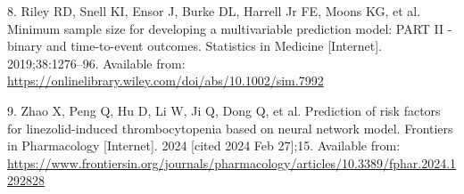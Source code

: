 \documentclass[
  letterpaper,
  DIV=11,
  numbers=noendperiod]{scrartcl}
\newlength{\cslhangindent}
\newenvironment{CSLReferences}[2] %
 {\begin{list}{}{%
  \setlength{\itemindent}{0pt}
  \setlength{\leftmargin}{0pt}
  \setlength{\parsep}{0pt}
  \ifodd #1
   \setlength{\leftmargin}{\cslhangindent}
   \setlength{\itemindent}{-1\cslhangindent}
  \fi
  \setlength{\itemsep}{#2\baselineskip}}}
 {\end{list}}
\begin{document}
\begin{CSLReferences}{0}{1}
8. Riley RD, Snell KI, Ensor J, Burke DL, Harrell Jr FE, Moons KG, et
al. Minimum sample size for developing a multivariable prediction model:
PART II - binary and time-to-event outcomes. Statistics in Medicine
{[}Internet{]}. 2019;38:1276--96. Available from:
\url{https://onlinelibrary.wiley.com/doi/abs/10.1002/sim.7992}

9. Zhao X, Peng Q, Hu D, Li W, Ji Q, Dong Q, et al. Prediction of risk
factors for linezolid-induced thrombocytopenia based on neural network
model. Frontiers in Pharmacology {[}Internet{]}. 2024 {[}cited 2024 Feb
27{]};15. Available from:
\url{https://www.frontiersin.org/journals/pharmacology/articles/10.3389/fphar.2024.1292828}

\end{CSLReferences}
\end{document}
